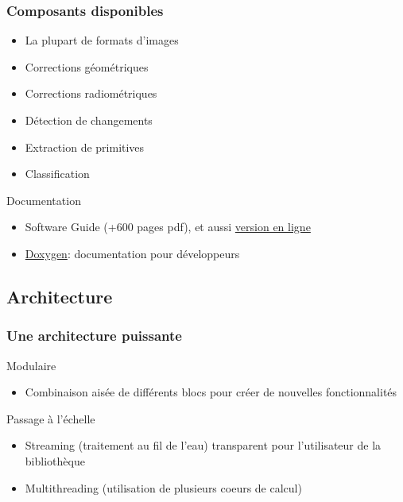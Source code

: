 \documentclass[compress,handout]{beamer}
\begin{document}
\begin{frame}
\frametitle{Composants disponibles}
 \begin{block}{}
\scriptsize
\begin{itemize}
\item La plupart de formats d'images
\item Corrections géométriques
\item Corrections radiométriques
\item Détection de changements
\item Extraction de primitives
\item Classification
\end{itemize}
\end{block}


 \begin{block}{Documentation}
\scriptsize
\begin{itemize}
\item Software Guide (+600 pages pdf), et aussi
  \href{http://www.orfeo-toolbox.org/SoftwareGuide/}{version en ligne}
\item \href{http://www.orfeo-toolbox.org/doxygen}{Doxygen}:
  documentation pour développeurs
\end{itemize}
\end{block}
\end{frame}

\subsection{Architecture}

\begin{frame}
 \frametitle{Une architecture puissante}
  \begin{block}{Modulaire}
\scriptsize
\begin{itemize}
\item Combinaison aisée de différents blocs pour créer de nouvelles fonctionnalités
\end{itemize}
\end{block}
  \begin{block}{Passage à l'échelle}
\scriptsize
\begin{itemize}
\item Streaming (traitement au fil de l'eau) transparent pour
  l'utilisateur de la bibliothèque
\item Multithreading (utilisation de plusieurs coeurs de calcul) 
\end{itemize}
\end{block}
\end{frame}
\end{document}
